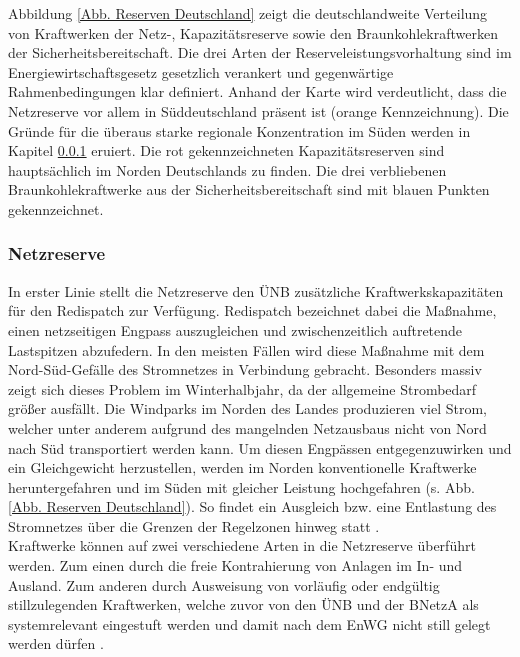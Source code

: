 		Abbildung \ref{Abb. Reserven Deutschland} zeigt die deutschlandweite Verteilung von Kraftwerken der Netz-, Kapazitätsreserve sowie den Braunkohlekraftwerken der Sicherheitsbereitschaft.
		Die drei Arten der Reserveleistungsvorhaltung sind im Energiewirtschaftsgesetz gesetzlich verankert und gegenwärtige Rahmenbedingungen klar definiert.
		Anhand der Karte wird verdeutlicht, dass die Netzreserve vor allem in Süddeutschland präsent ist (orange Kennzeichnung).
		Die Gründe für die überaus starke regionale Konzentration im Süden werden in Kapitel \ref{sect: Netzreserve} eruiert.
		Die rot gekennzeichneten Kapazitätsreserven sind hauptsächlich im Norden Deutschlands zu finden.
		Die drei verbliebenen Braunkohlekraftwerke aus der Sicherheitsbereitschaft sind mit blauen Punkten gekennzeichnet.
	
		\subsubsection{Netzreserve} \label{sect: Netzreserve}
		
			In erster Linie stellt die Netzreserve den ÜNB zusätzliche Kraftwerkskapazitäten für den Redispatch zur Verfügung.
			Redispatch bezeichnet dabei die Maßnahme, einen netzseitigen Engpass auszugleichen und zwischenzeitlich auftretende Lastspitzen abzufedern.
			In den meisten Fällen wird diese Maßnahme mit dem Nord-Süd-Gefälle des Stromnetzes in Verbindung gebracht.
			Besonders massiv zeigt sich dieses Problem im Winterhalbjahr, da der allgemeine Strombedarf größer ausfällt.
			Die Windparks im Norden des Landes produzieren viel Strom, welcher unter anderem aufgrund des mangelnden Netzausbaus nicht von Nord nach Süd transportiert werden kann.
			Um diesen Engpässen entgegenzuwirken und ein Gleichgewicht herzustellen, werden im Norden konventionelle Kraftwerke heruntergefahren und im Süden mit gleicher Leistung hochgefahren (s. Abb. \ref{Abb. Reserven Deutschland}).
			So findet ein Ausgleich bzw. eine Entlastung des Stromnetzes über die Grenzen der Regelzonen hinweg statt \cite{Netz_Kapa_Reserve_NextKraftwerke}. \\
			
			Kraftwerke können auf zwei verschiedene Arten in die Netzreserve überführt werden.
			Zum einen durch die freie Kontrahierung von Anlagen im In- und Ausland.
			Zum anderen durch Ausweisung von vorläufig oder endgültig stillzulegenden Kraftwerken, welche zuvor von den ÜNB und der BNetzA als systemrelevant eingestuft werden und damit nach dem EnWG nicht still gelegt werden dürfen \cite{EnWG}. \\
			
